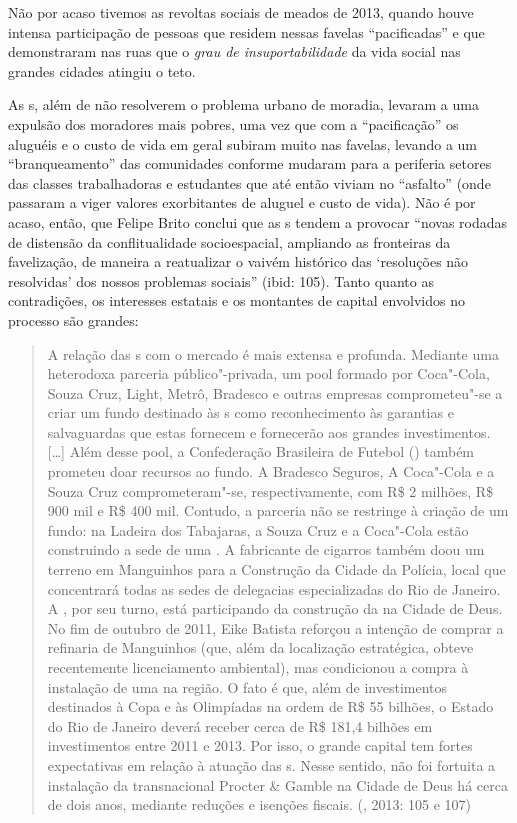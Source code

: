 Não por acaso tivemos as revoltas sociais de meados de 2013, quando
houve intensa participação de pessoas que residem nessas favelas
``pacificadas'' e que demonstraram nas ruas que o \emph{grau de
insuportabilidade} da vida social nas grandes cidades atingiu o teto.

As s, além de não resolverem o problema urbano de moradia, levaram a
uma expulsão dos moradores mais pobres, uma vez que com a
``pacificação'' os aluguéis e o custo de vida em geral subiram muito nas
favelas, levando a um ``branqueamento'' das comunidades conforme mudaram
para a periferia setores das classes trabalhadoras e estudantes que até
então viviam no ``asfalto'' (onde passaram a viger valores exorbitantes
de aluguel e custo de vida). Não é por acaso, então, que Felipe Brito
conclui que as s tendem a provocar ``novas rodadas de distensão da
conflitualidade socioespacial, ampliando as fronteiras da favelização,
de maneira a reatualizar o vaivém histórico das `resoluções não
resolvidas' dos nossos problemas sociais'' (ibid: 105). Tanto quanto as
contradições, os interesses estatais e os montantes de capital
envolvidos no processo são grandes:

\begin{quote}
A relação das s com o mercado é mais extensa e profunda. Mediante uma
heterodoxa parceria público"-privada, um pool formado por Coca"-Cola,
Souza Cruz, Light, Metrô, Bradesco e outras empresas comprometeu"-se a
criar um fundo destinado às s como reconhecimento às garantias e
salvaguardas que estas fornecem e fornecerão aos grandes investimentos.
{[}\ldots{}{]} Além desse pool, a Confederação Brasileira de Futebol ()
também prometeu doar recursos ao fundo. A Bradesco Seguros, A Coca"-Cola
e a Souza Cruz comprometeram"-se, respectivamente, com R\$ 2 milhões, R\$
900 mil e R\$ 400 mil. Contudo, a parceria não se restringe à criação de
um fundo: na Ladeira dos Tabajaras, a Souza Cruz e a Coca"-Cola estão
construindo a sede de uma . A fabricante de cigarros também doou um
terreno em Manguinhos para a Construção da Cidade da Polícia, local que
concentrará todas as sedes de delegacias especializadas do Rio de
Janeiro. A , por seu turno, está participando da construção da  na
Cidade de Deus. No fim de outubro de 2011, Eike Batista reforçou a
intenção de comprar a refinaria de Manguinhos (que, além da localização
estratégica, obteve recentemente licenciamento ambiental), mas
condicionou a compra à instalação de uma  na região. O fato é que,
além de investimentos destinados à Copa e às Olimpíadas na ordem de R\$
55 bilhões, o Estado do Rio de Janeiro deverá receber cerca de R\$ 181,4
bilhões em investimentos entre 2011 e 2013. Por isso, o grande capital
tem fortes expectativas em relação à atuação das s. Nesse sentido,
não foi fortuita a instalação da transnacional Procter \& Gamble na
Cidade de Deus há cerca de dois anos, mediante reduções e isenções
fiscais. (, 2013: 105 e 107)
\end{quote}

